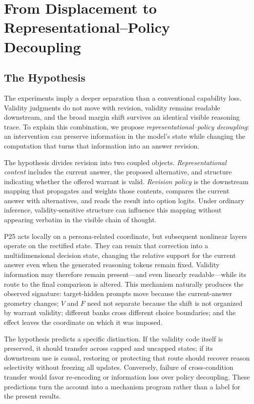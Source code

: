 \documentclass[letterpaper]{article} %
\begin{document}
\section{From Displacement to Representational--Policy Decoupling}
\label{sec:implications}

\subsection{The Hypothesis}

The experiments imply a deeper separation than a conventional capability loss. Validity judgments do not move with revision, validity remains readable downstream, and the broad margin shift survives an identical visible reasoning trace. To explain this combination, we propose \emph{representational--policy decoupling}: an intervention can preserve information in the model's state while changing the computation that turns that information into an answer revision.

The hypothesis divides revision into two coupled objects. \emph{Representational content} includes the current answer, the proposed alternative, and structure indicating whether the offered warrant is valid. \emph{Revision policy} is the downstream mapping that propagates and weights those contents, compares the current answer with alternatives, and reads the result into option logits. Under ordinary inference, validity-sensitive structure can influence this mapping without appearing verbatim in the visible chain of thought.

P25 acts locally on a persona-related coordinate, but subsequent nonlinear layers operate on the rectified state. They can remix that correction into a multidimensional decision state, changing the relative support for the current answer even when the generated reasoning tokens remain fixed. Validity information may therefore remain present---and even linearly readable---while its route to the final comparison is altered. This mechanism naturally produces the observed signature: target-hidden prompts move because the current-answer geometry changes; $V$ and $F$ need not separate because the shift is not organized by warrant validity; different banks cross different choice boundaries; and the effect leaves the coordinate on which it was imposed.

The hypothesis predicts a specific distinction. If the validity code itself is preserved, it should transfer across capped and uncapped states; if its downstream use is causal, restoring or protecting that route should recover reason selectivity without freezing all updates. Conversely, failure of cross-condition transfer would favor re-encoding or information loss over policy decoupling. These predictions turn the account into a mechanism program rather than a label for the present results.
\end{document}
